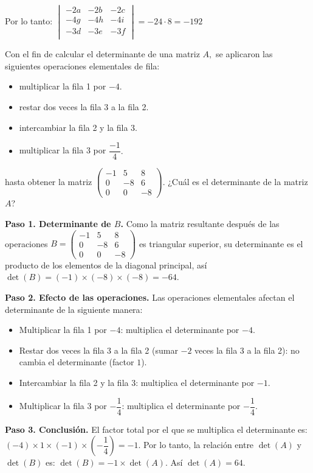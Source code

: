 \begin{prob}
\begin{myproof}
Por lo tanto: $\begin{vmatrix}
-2a&-2b&-2c\\-4g&-4h&-4i\\-3d&-3e&-3f\\
\end{vmatrix} = -24 \cdot 8 = \boxed{-192}$
\end{myproof}
\end{prob}

\begin{prob}
Con el fin de calcular el determinante de una matriz $A,$ se aplicaron las siguientes operaciones elementales de fila:
\begin{itemize}
\item multiplicar la fila 1 por $-4.$
\item restar dos veces la fila 3 a la fila 2.
\item intercambiar la fila 2 y la fila 3.
\item multiplicar la fila 3 por $\dfrac{-1}{4}.$
\end{itemize}
hasta obtener la matriz $\begin{pmatrix} -1&5&8\\0&-8&6\\0&0&-8 \end{pmatrix}.$ ¿Cuál es el determinante de la matriz $A$?
\begin{myproof}
\textbf{Paso 1. Determinante de $B$.} Como la matriz resultante después de las operaciones $
B = \begin{pmatrix} -1 & 5 & 8 \\ 0 & -8 & 6 \\ 0 & 0 & -8 \end{pmatrix}$ es triangular superior, su determinante es el producto de los elementos de la diagonal principal, así $
\det(B) = (-1) \times (-8) \times (-8) = -64.$

\textbf{Paso 2. Efecto de las operaciones.} Las operaciones elementales afectan el determinante de la siguiente manera:
\begin{itemize}
\item Multiplicar la fila 1 por $-4$: multiplica el determinante por $-4$.
\item Restar dos veces la fila 3 a la fila 2 (sumar $-2$ veces la fila 3 a la fila 2): no cambia el determinante (factor $1$).
\item Intercambiar la fila 2 y la fila 3: multiplica el determinante por $-1$.
\item Multiplicar la fila 3 por $-\dfrac{1}{4}$: multiplica el determinante por $-\dfrac{1}{4}$.
\end{itemize}

\textbf{Paso 3. Conclusión.} El factor total por el que se multiplica el determinante es: $
(-4) \times 1 \times (-1) \times \left(-\dfrac{1}{4}\right) = -1.$ Por lo tanto, la relación entre $\det(A)$ y $\det(B)$ es: $
\det(B) = -1 \times \det(A).$ Así $\boxed{\det(A) = 64}.$
\end{myproof}
\end{prob}

